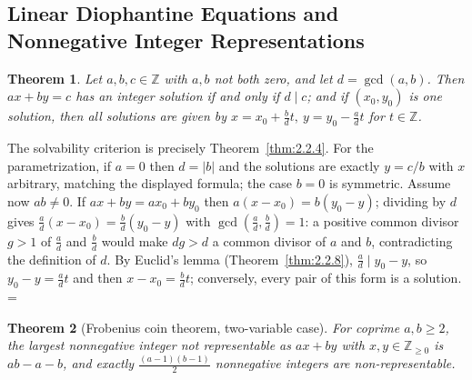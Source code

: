 \documentclass[11pt]{article}
\makeatletter
\let\nt@closedisplay\]
\def\nt@guardedclose{\@ifnextchar\par{\nt@closeafterpar}{\@ifnextchar\end{\postdisplaypenalty\@M\nt@closedisplay}{\nt@closedisplay}}}
\def\nt@closeafterpar\par{\@ifnextchar\par{\nt@closeafterpar}{\@ifnextchar\end{\postdisplaypenalty\@M\nt@closedisplay\par}{\nt@closedisplay\par}}}
\renewenvironment{proof}[1][\proofname]{\par
  \pushQED{\qed}\normalfont\topsep\medskipamount\edef\nt@afterproof{\@endparpenalty=\the\@endparpenalty\relax}\@beginparpenalty\@M\@endparpenalty\@M\let\]\nt@guardedclose\trivlist\item[]\textit{#1\@addpunct{.}} \ignorespaces}{\ifvmode\addpenalty\@M\fi\popQED\nt@afterproof\endtrivlist\@endpefalse}
\theoremstyle{ntstyle}
\newtheorem{theorem}{Theorem}[subsection]
\makeatother
\begin{document}
\subsection{Linear Diophantine Equations and Nonnegative Integer Representations}

\begin{theorem}\label{thm:2.6.1}\label{thm:linear-diophantine-parametrization}
  Let $a,b,c\in\mathbb{Z}$ with $a,b$ not both zero, and let $d=\gcd(a, b)$. Then
  $ax+by=c$ has an integer solution if and only if $d\mid c$; and if $(x_0,y_0)$
  is one solution, then all solutions are given by
  $x=x_0+\tfrac{b}{d}t,\ y=y_0-\tfrac{a}{d}t$ for $t\in\mathbb{Z}$.

\end{theorem}

\begin{proof}
  The solvability criterion is precisely Theorem~\ref{thm:2.2.4}. For the parametrization, if $a=0$ then $d=|b|$
  and the solutions are exactly $y=c/b$ with $x$ arbitrary, matching the displayed formula; the case $b=0$ is
  symmetric. Assume now $ab\neq0$. If $ax+by=ax_0+by_0$ then $a(x-x_0)=b(y_0-y)$; dividing by $d$ gives
  $\tfrac{a}{d}(x-x_0)=\tfrac{b}{d}(y_0-y)$ with
  $\gcd(\tfrac{a}{d}, \tfrac{b}{d})=1$: a positive common divisor $g>1$
  of $\tfrac{a}{d}$ and $\tfrac{b}{d}$ would make $dg>d$ a common divisor
  of $a$ and $b$, contradicting the definition of $d$.
  By Euclid's lemma (Theorem~\ref{thm:2.2.8}), $\tfrac{a}{d}\mid y_0-y$, so $y_0-y=\tfrac{a}{d} t$ and then
  $x-x_0=\tfrac{b}{d} t$;
  conversely, every pair of this form is a solution.
\end{proof}

\begin{theorem}[Frobenius coin theorem, two-variable case]\label{thm:2.6.2}\label{thm:frobenius-coin-theorem-two-variable-case}
  For coprime $a,b\ge2$, the largest nonnegative integer not
  representable as $ax+by$ with $x,y\in\mathbb{Z}_{\ge0}$ is $ab-a-b$, and
  exactly $\tfrac{(a-1)(b-1)}{2}$ nonnegative integers are non-representable.

\end{theorem}
\end{document}
